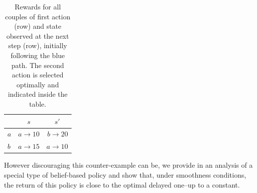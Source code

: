 \begin{table}[t]
\centering
\begin{tabular}{l|rr} 
  & \multicolumn{1}{c}{$s$} & \multicolumn{1}{c}{$s'$} \\ 
\hline
$a$ & $a\rightarrow10$ & $b\rightarrow20$ \\ 
$b$ & $a\rightarrow15$ & $a\rightarrow10$ \\
\end{tabular}
\caption{\label{tab:reward_blue_path}Rewards for all couples of first action (row) and state observed at the next step (row), initially following the blue path. The second action is selected optimally and indicated inside the table.}
\end{table}

However discouraging this counter-example can be, we provide in  an analysis of a special type of belief-based policy and show that, under smoothness conditions, the return of this policy is close to the optimal delayed one--up to a constant. 

